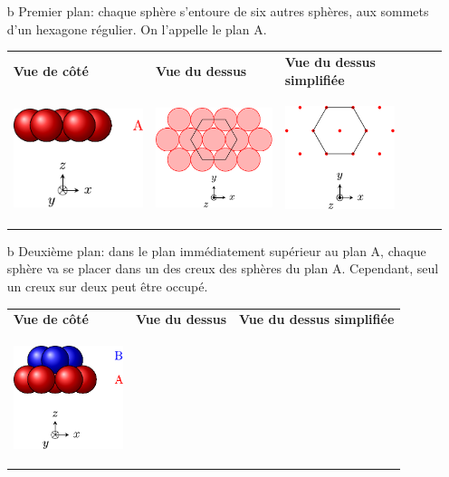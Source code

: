 \documentclass[../../main/main.tex]{subfiles}
\begin{document}
\begin{enumerate}
	\item[b]{Premier plan}: chaque sphère s'entoure de six autres sphères, aux
	sommets d'un hexagone régulier. On l'appelle le plan A.
	\smallbreak
	\noindent
	\begin{tabularx}{\linewidth}{YYY}
		\textbf{Vue de côté}
		 &
		\textbf{Vue du dessus}
		 &
		\textbf{Vue du dessus simplifiée}
		\\
		\begin{center}
			\includegraphics[height=3cm]{emp_A_1}
		\end{center}
		 &
		\begin{center}
			\includegraphics[height=3cm]{emp_A_2}
		\end{center}
		 &
		\begin{center}
			\includegraphics[height=3cm]{emp_A_3}
		\end{center}
	\end{tabularx}
	\item[b]{Deuxième plan}: dans le plan immédiatement supérieur au plan A,
	chaque sphère va se placer dans un des creux des sphères du plan A.
	Cependant, seul un creux sur deux peut être occupé.
	\smallbreak
	\noindent
	\begin{tabularx}{\linewidth}{YYY}
		\textbf{Vue de côté}
		 &
		\textbf{Vue du dessus}
		 &
		\textbf{Vue du dessus simplifiée}
		\\
		\begin{center}
			\includegraphics[height=3cm]{emp_AB_1}

\end{center}
\end{tabularx}
\end{enumerate}
\end{document}

